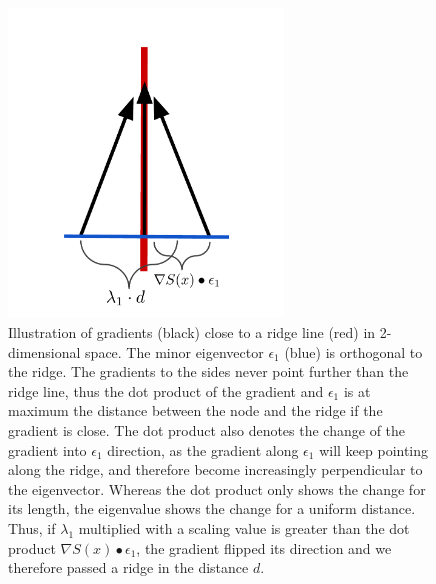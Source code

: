\begin{figure}
    \centering
    \includegraphics[width=0.65\textwidth]{Images/criterion.pdf}
    \caption{Illustration of gradients (black) close to a ridge line
    (red) in 2-dimensional space. The minor eigenvector $\epsilon_1$
    (blue) is orthogonal to the ridge. The gradients to the sides never
    point further than the ridge line, thus the dot product of the
    gradient and $\epsilon_1$ is at maximum the distance between the node
    and the ridge if the gradient is close. The dot product also denotes
    the change of the gradient into $\epsilon_1$ direction, as the
    gradient along $\epsilon_1$ will keep pointing along the ridge, and
    therefore become increasingly perpendicular to the eigenvector.
    Whereas the dot product only shows the change for its length, the
    eigenvalue shows the change for a uniform distance. Thus, if
    $\lambda_1$ multiplied with a scaling value is greater than the dot
    product $\nabla S(x) \bullet \epsilon_1$, the gradient flipped its
    direction and we therefore passed a ridge in the distance $d$.}
    \label{fig:criterion}
\end{figure}

